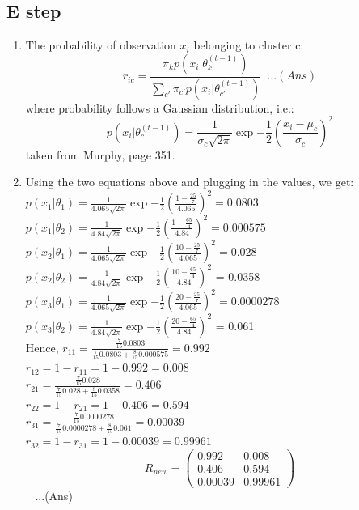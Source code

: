 \documentclass[letterpaper]{article}
\begin{document}
\subsection*{E step}
\begin{enumerate}
\item The probability of observation $x_i$ belonging to cluster c:
\begin{equation}
r_{ic} = \frac{\pi_kp(x_i|\theta_k^{(t-1)})}{\sum_{c'}{\pi_{c'}p(x_i|\theta_{c'}^{(t-1)})}} \,\,\, ...(Ans)
\end{equation}
where probability follows a Gaussian distribution, i.e.:
\begin{equation}
p(x_i|\theta_c^{(t-1)}) = \frac{1}{\sigma_c\sqrt{2\pi}}\exp{-\frac{1}{2}(\frac{x_i - \mu_c}{\sigma_c})^2}
\end{equation}
taken from Murphy, page 351.
\item
Using the two equations above and plugging in the values, we get: \\
$p(x_1|\theta_1) = \frac{1}{4.065\sqrt{2\pi}}\exp{-\frac{1}{2}(\frac{1 - \frac{25}{7}}{4.065})^2} = 0.0803$\\
$p(x_1|\theta_2) = \frac{1}{4.84\sqrt{2\pi}}\exp{-\frac{1}{2}(\frac{1 - \frac{65}{4}}{4.84})^2} = 0.000575$\\
$p(x_2|\theta_1) = \frac{1}{4.065\sqrt{2\pi}}\exp{-\frac{1}{2}(\frac{10 - \frac{25}{7}}{4.065})^2} = 0.028$\\
$p(x_2|\theta_2) = \frac{1}{4.84\sqrt{2\pi}}\exp{-\frac{1}{2}(\frac{10 - \frac{65}{4}}{4.84})^2}$ = 0.0358\\
$p(x_3|\theta_1) = \frac{1}{4.065\sqrt{2\pi}}\exp{-\frac{1}{2}(\frac{20 - \frac{25}{7}}{4.065})^2} = 0.0000278$\\
$p(x_3|\theta_2) = \frac{1}{4.84\sqrt{2\pi}}\exp{-\frac{1}{2}(\frac{20 - \frac{65}{4}}{4.84})^2}$ = 0.061\\

Hence, 
$r_{11} = \frac{\frac{7}{15}0.0803}{\frac{7}{15}0.0803 + \frac{8}{15}0.000575} = 0.992$\\
$r_{12} = 1 - r_{11} = 1 - 0.992  = 0.008$\\
$r_{21} = \frac{\frac{7}{15}0.028}{\frac{7}{15}0.028 + \frac{8}{15}0.0358} = 0.406$\\
$r_{22} = 1 - r_{21} = 1 - 0.406  = 0.594$\\
$r_{31} = \frac{\frac{7}{15}0.0000278}{\frac{7}{15}0.0000278 + \frac{8}{15}0.061} = 0.00039$\\
$r_{32} = 1 - r_{31} = 1 - 0.00039  = 0.99961$\\

\[ R_{new} = \left( \begin{array}{cc}
0.992 & 0.008 \\
0.406 & 0.594 \\
0.00039 & 0.99961 \end{array} \right)\]  \,\,\, ...(Ans)

\end{enumerate}
\end{document}
